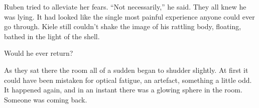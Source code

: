 Ruben tried to alleviate her fears.  ``Not necessarily,'' he said.  They all knew he was lying.  It had looked like the single most painful experience anyone could ever go through.  Kiele still couldn't shake the image of his rattling body, floating, bathed in the light of the shell.

Would he ever return?  

As they sat there the room all of a sudden began to shudder slightly.  At first it could have been mistaken for optical fatigue, an artefact, something a little odd.  It happened again, and in an instant there was a glowing sphere in the room.  Someone was coming back.





